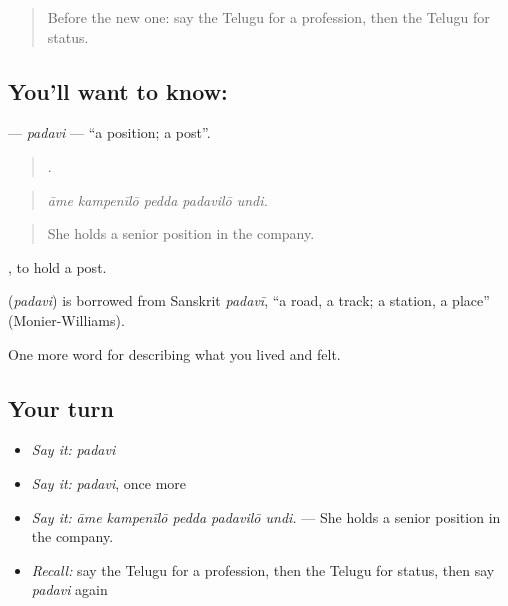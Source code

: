 \label{lesson:TE-C522-padavi}



\begin{quote}
Before the new one: say the Telugu for a profession, then the Telugu for status.
\end{quote}

\subsection*{You'll want to know: }
\textbf{} — \emph{padavi} — \textquotedblleft{}a position; a post\textquotedblright{}.

\begin{quote}
    .
\end{quote}

\begin{quote}
\emph{āme kampenīlō pedda padavilō undi.}
\end{quote}

\begin{quote}
She holds a senior position in the company.
\end{quote}

 , to hold a post.

\begin{cousinweb}
\textbf{} (\emph{padavi}) is borrowed from Sanskrit \emph{padavī}, \textquotedblleft{}a road, a track; a station, a place\textquotedblright{} (Monier-Williams).
\end{cousinweb}

\begin{grammarlens}[title={What you've built}]
One more word for describing what you lived and felt.
\end{grammarlens}

\subsection*{Your turn}
\begin{itemize}
\raggedright
  \item \emph{Say it:} \emph{padavi}
  \item \emph{Say it:} \emph{padavi}, once more
  \item \emph{Say it:} \emph{āme kampenīlō pedda padavilō undi.} — She holds a senior position in the company.
  \item \emph{Recall:} say the Telugu for a profession, then the Telugu for status, then say \emph{padavi} again
\end{itemize}

